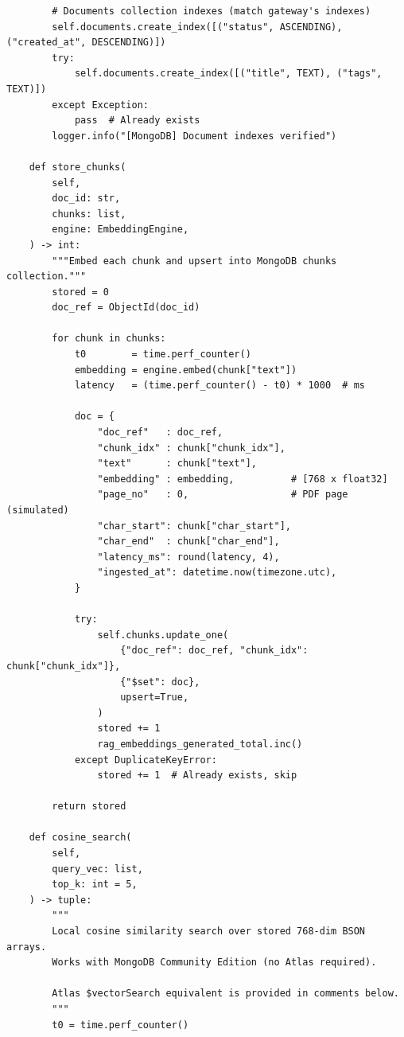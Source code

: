 \documentclass[12pt,a4paper]{report}
\begin{document}
\begin{lstlisting}
        # Documents collection indexes (match gateway's indexes)
        self.documents.create_index([("status", ASCENDING), ("created_at", DESCENDING)])
        try:
            self.documents.create_index([("title", TEXT), ("tags", TEXT)])
        except Exception:
            pass  # Already exists
        logger.info("[MongoDB] Document indexes verified")

    def store_chunks(
        self,
        doc_id: str,
        chunks: list,
        engine: EmbeddingEngine,
    ) -> int:
        """Embed each chunk and upsert into MongoDB chunks collection."""
        stored = 0
        doc_ref = ObjectId(doc_id)

        for chunk in chunks:
            t0        = time.perf_counter()
            embedding = engine.embed(chunk["text"])
            latency   = (time.perf_counter() - t0) * 1000  # ms

            doc = {
                "doc_ref"   : doc_ref,
                "chunk_idx" : chunk["chunk_idx"],
                "text"      : chunk["text"],
                "embedding" : embedding,          # [768 x float32]
                "page_no"   : 0,                  # PDF page (simulated)
                "char_start": chunk["char_start"],
                "char_end"  : chunk["char_end"],
                "latency_ms": round(latency, 4),
                "ingested_at": datetime.now(timezone.utc),
            }

            try:
                self.chunks.update_one(
                    {"doc_ref": doc_ref, "chunk_idx": chunk["chunk_idx"]},
                    {"$set": doc},
                    upsert=True,
                )
                stored += 1
                rag_embeddings_generated_total.inc()
            except DuplicateKeyError:
                stored += 1  # Already exists, skip

        return stored

    def cosine_search(
        self,
        query_vec: list,
        top_k: int = 5,
    ) -> tuple:
        """
        Local cosine similarity search over stored 768-dim BSON arrays.
        Works with MongoDB Community Edition (no Atlas required).

        Atlas $vectorSearch equivalent is provided in comments below.
        """
        t0 = time.perf_counter()


\end{lstlisting}
\end{document}
